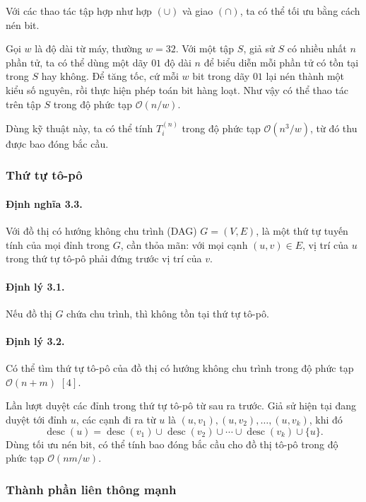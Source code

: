 \documentclass[11pt]{article}
\newcommand{\Oh}{\mathcal{O}}
\begin{document}
Với các thao tác tập hợp như hợp \((\cup)\) và giao \((\cap)\), ta có thể tối
ưu bằng cách nén bit.

Gọi \(w\) là độ dài từ máy, thường \(w=32\). Với một tập \(S\), giả sử \(S\)
có nhiều nhất \(n\) phần tử, ta có thể dùng một dãy \(01\) độ dài \(n\) để
biểu diễn mỗi phần tử có tồn tại trong \(S\) hay không. Để tăng tốc, cứ mỗi
\(w\) bit trong dãy \(01\) lại nén thành một kiểu số nguyên, rồi thực hiện
phép toán bit hàng loạt. Như vậy có thể thao tác trên tập \(S\) trong độ phức
tạp \(\Oh(n/w)\).

Dùng kỹ thuật này, ta có thể tính \(T_i^{(n)}\) trong độ phức tạp
\(\Oh(n^3/w)\), từ đó thu được bao đóng bắc cầu.

\subsubsection{Thứ tự tô-pô}

\paragraph{Định nghĩa 3.3.}
Với đồ thị có hướng không chu trình (DAG) \(G=(V,E)\),  là
một thứ tự tuyến tính của mọi đỉnh trong \(G\), cần thỏa mãn: với mọi cạnh
\((u,v)\in E\), vị trí của \(u\) trong thứ tự tô-pô phải đứng trước vị trí của
\(v\).

\paragraph{Định lý 3.1.}
Nếu đồ thị \(G\) chứa chu trình, thì không tồn tại thứ tự tô-pô.

\paragraph{Định lý 3.2.}
Có thể tìm thứ tự tô-pô của đồ thị có hướng không chu trình trong độ phức tạp
\(\Oh(n+m)\) \([4]\).

Lần lượt duyệt các đỉnh trong thứ tự tô-pô từ sau ra trước. Giả sử hiện tại
đang duyệt tới đỉnh \(u\), các cạnh đi ra từ \(u\) là
\((u,v_1),(u,v_2),\ldots,(u,v_k)\), khi đó
\[
  \operatorname{desc}(u)=
  \operatorname{desc}(v_1)\cup\operatorname{desc}(v_2)\cup\cdots
  \cup\operatorname{desc}(v_k)\cup\{u\}.
\]
Dùng tối ưu nén bit, có thể tính bao đóng bắc cầu cho đồ thị tô-pô trong độ
phức tạp \(\Oh(nm/w)\).

\subsubsection{Thành phần liên thông mạnh}
\end{document}

